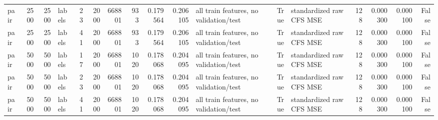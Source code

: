 \begin{tabular}{lrrlrrrrrrlrlrrrr}
pair & 2500 & 2500 & labels & 23 & 2000 & 668801 & 933 & 0.179564 & 0.206105 & all train features, no validation/test & True & standardized raw CFS MSE & 128 & 0.000300 & 0.000100 & False \\
pair & 2500 & 2500 & labels & 41 & 2000 & 668801 & 933 & 0.179564 & 0.206105 & all train features, no validation/test & True & standardized raw CFS MSE & 128 & 0.000300 & 0.000100 & False \\
pair & 5000 & 5000 & labels & 17 & 2000 & 668801 & 1020 & 0.178068 & 0.204095 & all train features, no validation/test & True & standardized raw CFS MSE & 128 & 0.000300 & 0.000100 & False \\
pair & 5000 & 5000 & labels & 23 & 2000 & 668801 & 1020 & 0.178068 & 0.204095 & all train features, no validation/test & True & standardized raw CFS MSE & 128 & 0.000300 & 0.000100 & False \\
pair & 5000 & 5000 & labels & 41 & 2000 & 668801 & 1020 & 0.178068 & 0.204095 & all train features, no validation/test & True & standardized raw CFS MSE & 128 & 0.000300 & 0.000100 & False \\
\bottomrule
\end{tabular}
